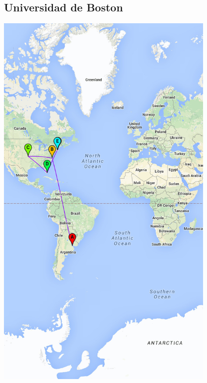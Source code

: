 \subsection{Universidad de Boston}
\centerline{\includegraphics[width=0.8\textwidth]{mapas/EEUU.jpg}}


